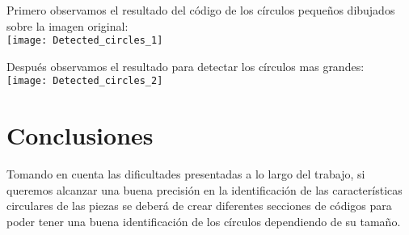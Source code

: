 \documentclass{article}
\begin{document}
	Primero observamos el resultado del código de los círculos pequeños dibujados sobre la imagen original: \\
	
	\texttt{[image: Detected\_circles\_1]}
	
	Después observamos el resultado para detectar los círculos mas grandes: \\
	
	\texttt{[image: Detected\_circles\_2]}
	
	\section*{Conclusiones}
	
	Tomando en cuenta las dificultades presentadas a lo largo del trabajo, si queremos alcanzar una buena precisión en la identificación de las características circulares de las piezas se deberá de crear diferentes secciones de códigos para poder tener una buena identificación de los círculos dependiendo de su tamaño. 
	
	
\end{document}
